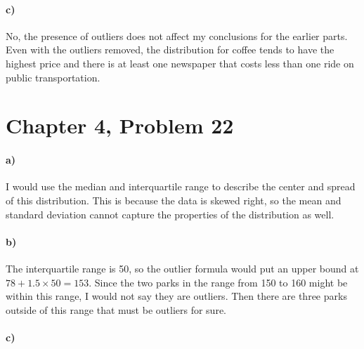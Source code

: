 \documentclass[12pt]{article}
\begin{document}
\paragraph{c)}

No, the presence of outliers does not affect my conclusions for the earlier parts. Even with the outliers
removed, the distribution for coffee tends to have the highest price and there is at least one
newspaper that costs less than one ride on public transportation.

\section*{Chapter 4, Problem 22}

\paragraph{a)}

I would use the median and interquartile range to describe the center and spread of this distribution.
This is because the data is skewed right, so the mean and standard deviation cannot capture the
properties of the distribution as well.

\paragraph{b)}

The interquartile range is 50, so the outlier formula would put an upper bound at \(78+1.5\times 50=153\).
Since the two parks in the range from 150 to 160 might be within this range, I would not say they are
outliers. Then there are three parks outside of this range that must be outliers for sure.

\paragraph{c)}

\begin{center}
\end{center}
\end{document}

